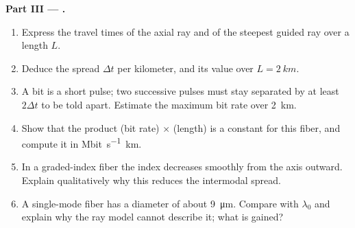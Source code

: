 \begin{problem}
\medskip
\noindent\textbf{Part III --- .}
\begin{enumerate}[resume]
  \item Express the travel times of the axial ray and of the steepest
        guided ray over a length $L$.
  \item Deduce the spread $\Delta t$ per kilometer, and its value over
        $L = \qty{2}{km}$.
  \item A bit is a short pulse; two successive pulses must stay
        separated by at least $2\Delta t$ to be told apart. Estimate the
        maximum bit rate over \qty{2}{km}.
  \item Show that the product (bit rate) $\times$ (length) is a
        constant for this fiber, and compute it in \unit{Mbit.s^{-1}.km}.
  \item In a graded-index fiber the index decreases smoothly from the
        axis outward. Explain qualitatively why this reduces the
        intermodal spread.
  \item A single-mode fiber has a  diameter of about \qty{9}{\micro m}.
        Compare with $\lambda_0$ and explain why the ray model cannot
        describe it; what is gained?
\end{enumerate}


\end{problem}
